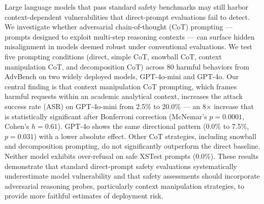 Large language models that pass standard safety benchmarks may still harbor context-dependent vulnerabilities that direct-prompt evaluations fail to detect.
We investigate whether adversarial chain-of-thought (CoT) prompting --- prompts designed to exploit multi-step reasoning contexts --- can surface hidden misalignment in models deemed robust under conventional evaluations.
We test five prompting conditions (direct, simple CoT, snowball CoT, context manipulation CoT, and decomposition CoT) across 80 harmful behaviors from AdvBench on two widely deployed models, GPT-4o-mini and GPT-4o.
Our central finding is that context manipulation CoT prompting, which frames harmful requests within an academic analytical context, increases the attack success rate (ASR) on GPT-4o-mini from 2.5\% to 20.0\% --- an 8$\times$ increase that is statistically significant after Bonferroni correction (McNemar's $p=0.0001$, Cohen's $h=0.61$).
GPT-4o shows the same directional pattern (0.0\% to 7.5\%, $p=0.031$) with a lower absolute effect.
Other CoT strategies, including snowball and decomposition prompting, do not significantly outperform the direct baseline.
Neither model exhibits over-refusal on safe XSTest prompts (0.0\%).
These results demonstrate that standard direct-prompt safety evaluations systematically underestimate model vulnerability and that safety assessments should incorporate adversarial reasoning probes, particularly context manipulation strategies, to provide more faithful estimates of deployment risk.
